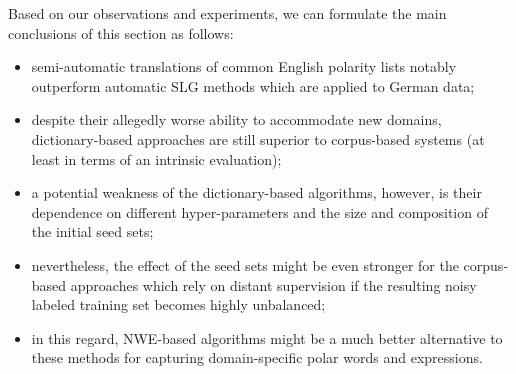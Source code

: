 Based on our observations and experiments, we can formulate the main
conclusions of this section as follows:
\begin{itemize}
\item semi-automatic translations of common English polarity lists
  notably outperform automatic SLG methods which are applied to German
  data;
\item despite their allegedly worse ability to accommodate new
  domains, dictionary-based approaches are still superior to
  corpus-based systems (at least in terms of an intrinsic evaluation);
\item a potential weakness of the dictionary-based algorithms,
  however, is their dependence on different hyper-parameters and the
  size and composition of the initial seed sets;
\item nevertheless, the effect of the seed sets might be even stronger
  for the corpus-based approaches which rely on distant supervision if
  the resulting noisy labeled training set becomes highly unbalanced;
\item in this regard, NWE-based algorithms might be a much better
  alternative to these methods for capturing domain-specific polar
  words and expressions.
\end{itemize}

\newpage
